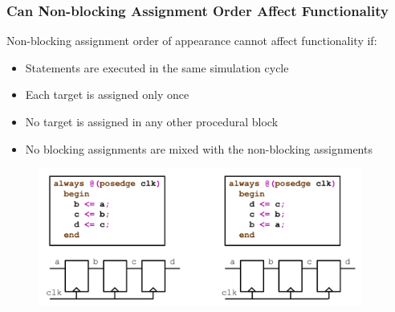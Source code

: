 \documentclass[t, notes, xcolor=table]{beamer}
\begin{document}
\begin{frame}
\frametitle{Can Non-blocking Assignment Order Affect Functionality}
Non-blocking assignment order of appearance cannot affect functionality if:
\begin{itemize}
\item Statements are executed in the same simulation cycle
\item Each target is assigned only once
\item No target is assigned in any other procedural block
\item No blocking assignments are mixed with the non-blocking assignments
\end{itemize}
\begin{figure}
    \includegraphics[width=0.95\textwidth]{img/07_nonblock_order.png}
\end{figure}
\end{frame}
\end{document}

